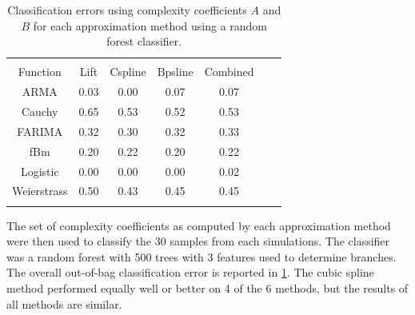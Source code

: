 \begin{table}[!htbp] \centering 
\begin{tabular}{@{\extracolsep{1pt}} ccccccc} 
\\[-1.8ex]\hline 
\hline \\[-1.8ex] 
Function    &  Lift & Cspline & Bpsline  & Combined 
                                       \\ \hline
ARMA        & 0.03 &   0.00 &   0.07 &   0.07  \\ 
Cauchy      & 0.65 &   0.53 &   0.52  &    0.53  \\ 
FARIMA      & 0.32 &   0.30 &   0.32  &    0.33 \\ 
fBm         & 0.20  &   0.22  & 0.20 &  0.22  \\ 
Logistic    & 0.00 &   0.00 &   0.00  &    0.02  \\ 
Weierstrass & 0.50 &   0.43 &   0.45  &    0.45  \\
\hline \\[-1.8ex] 
          \end{tabular} 
  \caption{Classification errors using complexity coefficients  
  $A$ and $B$ for each approximation method using a random 
  forest classifier.}
  \label{tab:error-all}
\end{table}

The set of complexity coefficients as computed by each 
approximation method were then used to classify the 30 samples from each simulations. The classifier was a random forest with 
500 trees with 3 features used to determine branches. The overall out-of-bag classification error is reported in \ref{tab:error-all}. The cubic 
spline method performed equally well or better
on 4 of the 6 methods, but the results of all methods are 
similar.


